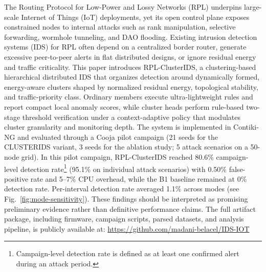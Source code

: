 The Routing Protocol for Low-Power and Lossy Networks (RPL) underpins large-scale Internet of Things (IoT) deployments, yet its open control plane exposes constrained nodes to internal attacks such as rank manipulation, selective forwarding, wormhole tunneling, and DAO flooding.
Existing intrusion detection systems (IDS) for RPL often depend on a centralized border router, generate excessive peer-to-peer alerts in flat distributed designs, or ignore residual energy and traffic criticality.
This paper introduces RPL-ClusterIDS, a clustering-based hierarchical distributed IDS that organizes detection around dynamically formed, energy-aware clusters shaped by normalized residual energy, topological stability, and traffic-priority class.
Ordinary members execute ultra-lightweight rules and report compact local anomaly scores, while cluster heads perform rule-based two-stage threshold verification under a context-adaptive policy that modulates cluster granularity and monitoring depth.
The system is implemented in Contiki-NG and evaluated through a Cooja pilot campaign (21 seeds for the CLUSTERIDS variant, 3 seeds for the ablation study; 5 attack scenarios on a 50-node grid).
In this pilot campaign, RPL-ClusterIDS reached 80.6\% campaign-level detection rate\footnote{Campaign-level detection rate is defined as at least one confirmed alert during an attack period.} (95.1\% on individual attack scenarios) with 0.50\% false-positive rate and 5--7\% CPU overhead, while the B1 baseline remained at 0\% detection rate. Per-interval detection rate averaged 1.1\% across modes (see Fig.~\ref{fig:mode-sensitivity}). These findings should be interpreted as promising preliminary evidence rather than definitive performance claims.
The full artifact package, including firmware, campaign scripts, parsed datasets, and analysis pipeline, is publicly available at: \url{https://github.com/madani-belacel/IDS-IOT}
